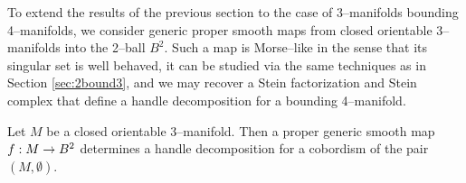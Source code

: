 \label{sec:3bound4}

To extend the results of the previous section to the case of 3--manifolds bounding 4--manifolds, we consider generic proper smooth maps from closed orientable 3--manifolds into the 2--ball $B^2$.
Such a map is Morse--like in the sense that its singular set is well behaved, it can be studied via the same techniques as in Section \ref{sec:2bound3}, and we may recover a Stein factorization and Stein complex that define a handle decomposition for a bounding 4--manifold.

\begin{theorem}
	\label{thm:3bound4}
	Let $M$ be a closed orientable 3--manifold.
	Then a proper generic smooth map $f:M\to B^2$ determines a handle decomposition for a cobordism of the pair $(M,\emptyset)$.
\end{theorem}

